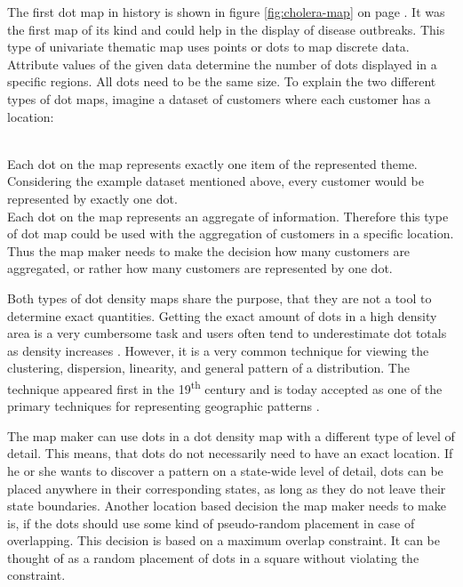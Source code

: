 The first dot map in history is shown in figure \ref{fig:cholera-map} on page \pageref{fig:cholera-map}. It was the first map of its kind and could help in the display of disease outbreaks. This type of univariate thematic map uses points or dots to map discrete data. Attribute values of the given data determine the number of dots displayed in a specific regions. All dots need to be the same size. To explain the two different types of dot maps, imagine a dataset of customers where each customer has a location:

\begin{enumerate}
 \hfill \\
Each dot on the map represents exactly one item of the represented theme. Considering the example dataset mentioned above, every customer would be represented by exactly one dot.
 \hfill \\
Each dot on the map represents an aggregate of information. Therefore this type of dot map could be used with the aggregation of customers in a specific location. Thus the map maker needs to make the decision how many customers are aggregated, or rather how many customers are represented by one dot.
\end{enumerate}

Both types of dot density maps share the purpose, that they are not a tool to determine exact quantities. Getting the exact amount of dots in a high density area is a very cumbersome task and users often tend to underestimate dot totals as density increases . However, it is a very common technique for viewing the clustering, dispersion, linearity, and general pattern of a distribution. The technique appeared first in the 19\textsuperscript{th} century and is today accepted as one of the primary techniques for representing geographic patterns .

The map maker can use dots in a dot density map with a different type of level of detail. This means, that dots do not necessarily need to have an exact location. If he or she wants to discover a pattern on a state-wide level of detail, dots can be placed anywhere in their corresponding states, as long as they do not leave their state boundaries.
Another location based decision the map maker needs to make is, if the dots should use some kind of pseudo-random placement in case of overlapping. This decision is based on a maximum overlap constraint. It can be thought of as a random placement of dots in a square without violating the constraint.

